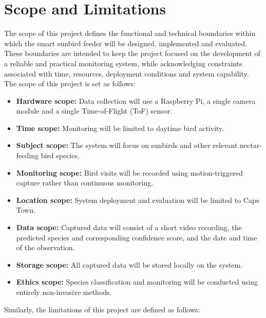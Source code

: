 \section{Scope and Limitations}
The scope of this project defines the functional and technical boundaries within which the smart sunbird feeder will be designed, implemented and evaluated. These boundaries are intended to keep the project focused on the development of a reliable and practical monitoring system, while acknowledging constraints associated with time, resources, deployment conditions and system capability. The scope of this project is set as follows:
\begin{itemize}
\item \textbf{Hardware scope:} Data collection will use a Raspberry Pi, a single camera module and a single Time-of-Flight (ToF) sensor.
\item \textbf{Time scope:} Monitoring will be limited to daytime bird activity.
\item \textbf{Subject scope:} The system will focus on sunbirds and other relevant nectar-feeding bird species.
\item \textbf{Monitoring scope:} Bird visits will be recorded using motion-triggered capture rather than continuous monitoring.
\item \textbf{Location scope:} System deployment and evaluation will be limited to Cape Town.
\item \textbf{Data scope:} Captured data will consist of a short video recording, the predicted species and corresponding confidence score, and the date and time of the observation.
\item \textbf{Storage scope:} All captured data will be stored locally on the system.
\item \textbf{Ethics scope:} Species classification and monitoring will be conducted using entirely non-invasive methods.
\end{itemize}

Similarly, the limitations of this project are defined as follows:

